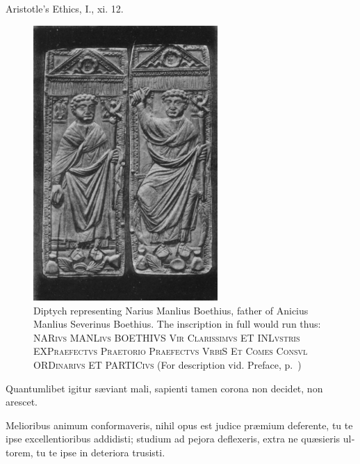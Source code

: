 \documentclass[11pt]{book}
\begin{document}
\vspace{2em}

\noindent Aristotle's Ethics, I., xi. 12.

\vfill

\pagebreak
\thispagestyle{empty}
\hspace{0pt}
\vfill

\begin{figure}[ht!]
\centering
\includegraphics[width=70mm]{image01.jpg}
\caption{Diptych representing Narius Manlius Boethius, father of
Anicius Manlius Severinus Boethius. The inscription in full would run
thus: \textsc{NARivs MANLivs BOETHIVS Vir Clarissimvs ET INLvstris
EXPraefectvs Praetorio Praefectvs VrbiS Et Comes Consvl ORDinarivs ET
PARTICivs} (For description vid. Preface, p.~\pageref{diptych})}
\end{figure}

\pagebreak
\thispagestyle{empty}


\vfill

\maketitle

\thispagestyle{empty}
\hspace{0pt}
\vfill

\begin{latin}
Quantumlibet igitur sæviant mali, sapienti tamen corona non
decidet, non arescet.

Melioribus animum conformaveris, nihil opus est judice præmium      
deferente, tu te ipse excellentioribus addidisti; studium ad pejora     
deflexeris, extra ne quæsieris ultorem, tu te ipse in deteriora        
trusisti.                                                               
\end{latin}
\end{document}
